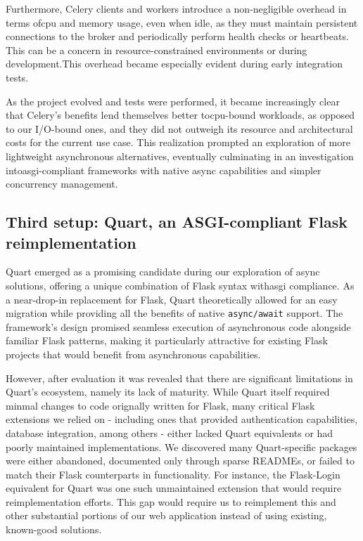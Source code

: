         Furthermore, Celery clients and workers introduce a non-negligible overhead in terms of\ac{cpu} and memory usage, even when 
        idle, as they must maintain persistent connections to the broker and periodically perform health checks or heartbeats. 
        This can be a concern in resource-constrained environments or during development.This overhead became especially evident 
        during early integration tests.

        As the project evolved and tests were performed, it became increasingly clear that Celery's benefits lend themselves better 
        to\ac{cpu}-bound workloads, as opposed to our I/O-bound ones, and they did not outweigh its resource and architectural costs for 
        the current use case. This realization prompted an exploration of more lightweight asynchronous alternatives, eventually 
        culminating in an investigation into\ac{asgi}-compliant frameworks with native async capabilities and simpler concurrency 
        management.

    \subsection{Third setup: Quart, an ASGI-compliant Flask reimplementation}

        Quart emerged as a promising candidate during our exploration of async solutions, offering a unique combination of 
        Flask syntax with\ac{asgi} compliance. As a near-drop-in replacement for Flask, Quart theoretically allowed for 
        an easy migration while providing all the benefits of native \texttt{async/await} support. The framework's design promised 
        seamless execution of asynchronous code alongside familiar Flask patterns, making it particularly attractive for 
        existing Flask projects that would benefit from asynchronous capabilities.

        However, after evaluation it was revealed that there are significant limitations in Quart's ecosystem, namely its lack of 
        maturity. While Quart itself required minmal changes to code orignally written for Flask, many critical Flask extensions we 
        relied on - including ones that provided authentication capabilities, database integration, among others - either lacked Quart 
        equivalents or had poorly maintained implementations. We discovered many Quart-specific packages were either abandoned, documented 
        only through sparse READMEs, or failed to match their Flask counterparts in functionality. For instance, the Flask-Login equivalent 
        for Quart was one such unmaintained extension that would require reimplementation efforts. This gap would require us to reimplement 
        this and other substantial portions of our web application instead of using existing, known-good solutions.

